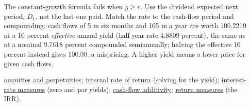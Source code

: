 \begin{qfmethod}
 The constant-growth formula fails when $g\ge r$. Use the dividend expected next period, $D_1$, not the last one paid. Match the rate to the cash-flow period and compounding: cash flows of 5 in six months and 105 in a year are worth 100.2219 at a 10 percent \emph{effective} annual yield (half-year rate 4.8809 percent), the same as at a nominal 9.7618 percent compounded semiannually; halving the effective 10 percent instead gives 100.00, a mispricing. A higher yield means a lower price for given cash flows.

 \hyperref[meth:cash-flow-streams]{annuities and perpetuities}; \hyperref[meth:internal-rate-of-return]{internal rate of return} (solving for the yield); \hyperref[def:interest-rate-measures]{interest-rate measures} (zero and par yields); \hyperref[res:cash-flow-additivity]{cash-flow additivity}; \hyperref[def:return-measures]{return measures} (the IRR).

\end{qfmethod}

